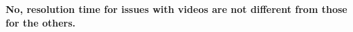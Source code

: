 


{\bf No, resolution time for issues with videos are not different from those for the others. 
}

